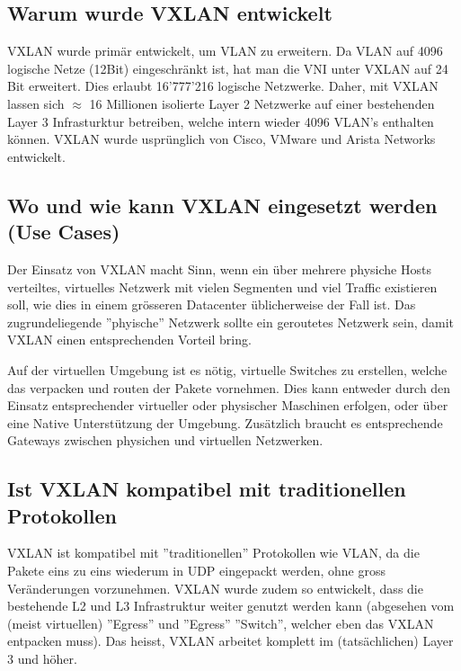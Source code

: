 \subsection{Warum wurde VXLAN entwickelt}
VXLAN wurde primär entwickelt, um VLAN zu erweitern. Da VLAN auf 4096 logische Netze (12Bit) eingeschränkt ist, hat man die VNI unter VXLAN auf 24 Bit erweitert. Dies erlaubt 16'777'216 logische Netzwerke. Daher, mit VXLAN lassen sich $\approx$ 16 Millionen isolierte Layer 2 Netzwerke auf einer bestehenden Layer 3 Infrasturktur betreiben, welche intern wieder 4096 VLAN's enthalten können. VXLAN wurde usprünglich von Cisco, VMware und Arista Networks entwickelt. 

\subsection{Wo und wie kann VXLAN eingesetzt werden (Use Cases)}

Der Einsatz von VXLAN macht Sinn, wenn ein über mehrere physiche Hosts verteiltes, virtuelles Netzwerk mit vielen Segmenten und viel Traffic existieren soll, wie dies in einem grösseren Datacenter üblicherweise der Fall ist. Das zugrundeliegende ''phyische'' Netzwerk sollte ein geroutetes Netzwerk sein, damit VXLAN einen entsprechenden Vorteil bring.

Auf der virtuellen Umgebung ist es nötig, virtuelle Switches zu erstellen, welche das verpacken und routen der Pakete vornehmen. Dies kann entweder durch den Einsatz entsprechender virtueller oder physischer Maschinen erfolgen, oder über eine Native Unterstützung der Umgebung. Zusätzlich braucht es entsprechende Gateways zwischen physichen und virtuellen Netzwerken.

\subsection{Ist VXLAN kompatibel mit traditionellen Protokollen}

VXLAN ist kompatibel mit ''traditionellen'' Protokollen wie VLAN, da die Pakete eins zu eins wiederum in UDP eingepackt werden, ohne gross Veränderungen vorzunehmen. 
VXLAN wurde zudem so entwickelt, dass die bestehende L2 und L3 Infrastruktur weiter genutzt werden kann (abgesehen vom (meist virtuellen) ''Egress'' und ''Egress'' ''Switch'', welcher eben das VXLAN entpacken muss). Das heisst, VXLAN arbeitet komplett im (tatsächlichen) Layer 3 und höher.

